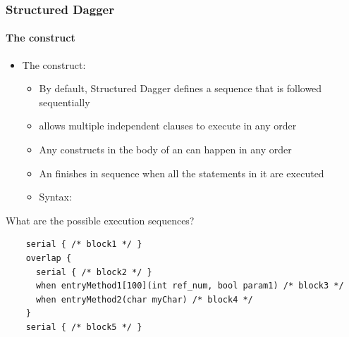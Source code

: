 
\begin{frame}[fragile]
  \frametitle{Structured Dagger}
  \framesubtitle{The  construct}
  \begin{itemize}
  \item The  construct:
    \begin{itemize}
    \item By default, Structured Dagger defines a sequence that is followed sequentially
    \item {} allows multiple independent clauses to execute in any order
    \item Any constructs in the body of an  can happen in any
      order
    \item An  finishes in sequence when all the statements in it
      are executed
    \item Syntax: 
    \end{itemize}
  \end{itemize}
  What are the possible execution sequences?
  \begin{lstlisting}
    serial { /* block1 */ }
    overlap {
      serial { /* block2 */ }
      when entryMethod1[100](int ref_num, bool param1) /* block3 */
      when entryMethod2(char myChar) /* block4 */
    }
    serial { /* block5 */ }
  \end{lstlisting}
\end{frame}

